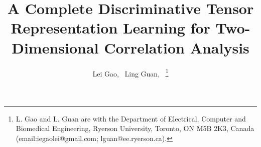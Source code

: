 \documentclass[journal]{IEEEtran}
\begin{document}
%
\title{A Complete Discriminative Tensor Representation Learning for Two-Dimensional Correlation Analysis}
%
%
%

\author{Lei Gao,~
        Ling Guan,~%
\thanks{L. Gao and L. Guan are with the Department of Electrical, Computer and Biomedical Engineering, Ryerson University, Toronto, ON M5B 2K3, Canada (email:iegaolei@gmail.com; lguan@ee.ryerson.ca).}}%

%
%
\end{document}
